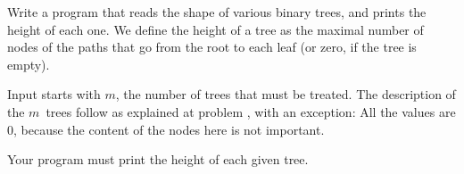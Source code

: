 



\Statement

Write a program that reads the shape of various binary trees,
and prints the height of each one.
We define the height of a tree
as the maximal number of nodes
of the paths that go from the root to each leaf
(or zero, if the tree is empty).



\Input

Input starts with $m$, the number of trees that must be treated.
The description of the $m$~trees follow
as explained at problem , with an exception:
All the values are 0,
because the content of the nodes here is not important.



\Output

Your program must print the height of each given tree.



\SampleOneCol
